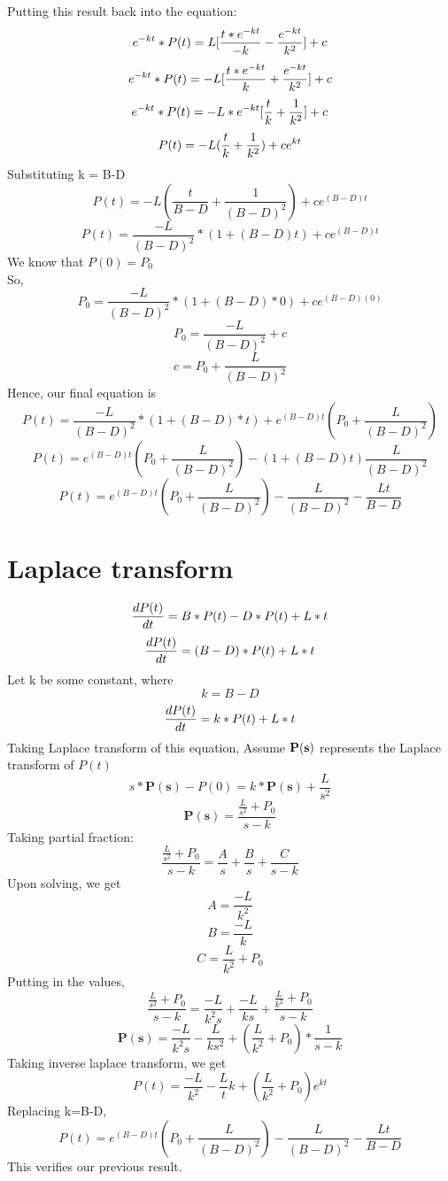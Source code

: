 \documentclass[a4paper]{article}
\begin{document}
Putting this result back into the equation:
$$
e^{-kt}*P(t) = L [  \frac {t*e^{-kt}}{-k} - \frac {e^{-kt}}{k^2} ] +c \\
$$
$$
e^{-kt}*P(t) = -L [  \frac {t*e^{-kt}}{k} + \frac {e^{-kt}}{k^2} ] +c \\
$$
$$
e^{-kt}*P(t) = -L * e^{-kt} [  \frac {t}{k} + \frac {1}{k^2} ] +c \\
$$
$$
P(t) = -L  (  \frac {t}{k} + \frac {1}{k^2} ) +ce^{kt} \\
$$
Substituting k = B-D
$$
P(t)= -L ( \frac {t}{B-D} + \frac {1}{(B-D)^2}) + ce^{(B-D)t}
$$
$$
P(t) = \frac {-L}{(B-D)^2}* (1+ (B-D)t) + ce^{(B-D)t}
$$
We know that $P(0) = P_0$ \\
So,
$$
P_0 =  \frac {-L}{(B-D)^2}* (1+ (B-D)*0) + ce^{(B-D)(0)}
$$
$$
P_0 =  \frac {-L}{(B-D)^2} + c
$$
$$
c = P_0 + \frac{L}{(B-D)^2}
$$
Hence, our final equation is 
$$
P(t) = \frac {-L}{(B-D)^2}* (1+ (B-D)*t) + e^{(B-D)t}(P_0 + \frac{L}{(B-D)^2})
$$
$$
P(t) = e^{(B-D)t}(P_0 + \frac{L}{(B-D)^2}) - (1+(B-D)t)\frac{L}{(B-D)^2}
$$
$$
P(t) = e^{(B-D)t}(P_0 + \frac{L}{(B-D)^2}) - \frac{L}{(B-D)^2} - \frac {Lt}{B-D}
$$



\section*{Laplace transform}
$$
\frac{dP(t)}{dt}= B*P(t) - D*P(t) + L*t  \\
$$
$$
\frac{dP(t)}{dt}= (B-D)*P(t) + L*t \\
$$
Let k be some constant, where
$$
k=B-D 
$$
$$
\frac{dP(t)}{dt}= k*P(t) + L*t \\
$$
Taking Laplace transform of this equation,
Assume $\bf{P}(s)$ represents the Laplace transform of $P(t)$
$$
s* \mathbf{P(s)} - P(0) = k* \mathbf{P(s)} + \frac{L}{s^2}
$$
$$
\mathbf{P(s)} = \frac{\frac{L}{s^2} + P_0}{s-k}
$$
Taking partial fraction:
$$
\frac{\frac{L}{s^2} + P_0}{s-k} = \frac{A}{s} + \frac{B}{s} + \frac{C}{s-k}
$$
Upon solving, we get
$$
A = \frac{-L}{k^2}
$$
$$
B = \frac {-L}{k}
$$
$$
C = \frac{L}{k^2} + P_0
$$
Putting in the values,
$$
\frac{\frac{L}{s^2} + P_0}{s-k}  = \frac{-L}{k^2s} + \frac{-L}{ks} + \frac{\frac{L}{k^2} + P_0}{s-k}
$$
$$
\mathbf{P(s)} = \frac{-L}{k^2s}-\frac{L}{ks^2}+ (\frac{L}{k^2} + P_0)*\frac{1}{s-k}
$$
Taking inverse laplace transform, we get
$$
P(t) = \frac{-L}{k^2} - \frac{L}t{k}+(\frac{L}{k^2}+P_0)e^{kt}
$$
Replacing k=B-D,
$$
P(t) = e^{(B-D)t}(P_0 + \frac{L}{(B-D)^2}) - \frac{L}{(B-D)^2} - \frac {Lt}{B-D}
$$
This verifies our previous result.
\end{document}
